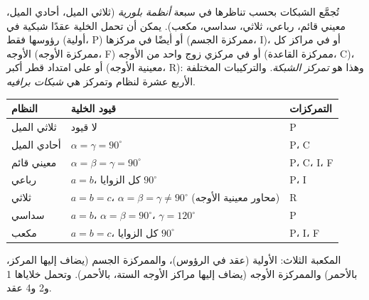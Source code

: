 \begin{definition}\label{def:b3:x-ray-diffraction:crystal-system}
تُجمَّع الشبكات بحسب تناظرها في سبعة \emph{أنظمة
بلورية} (ثلاثي الميل، أحادي الميل، معيني قائم، رباعي،
ثلاثي، سداسي، مكعب). يمكن أن تحمل الخلية عقدًا شبكية في رؤوسها فقط
(أولية، P) أو أيضًا في مركزها (ممركزة الجسم، I)، أو في مراكز كل
الأوجه (ممركزة الأوجه، F) أو في مركزي زوج واحد من الأوجه (ممركزة القاعدة، C)، أو على امتداد
قطر أكبر (معينية الأوجه، R): وهذا هو \emph{تمركز
الشبكة}. والتركيبات المختلفة الأربع عشرة لنظام 
وتمركز هي \emph{شبكات برافيه}.
\end{definition}

\begin{center}\small
\begin{tabular}{lll}
\hline
النظام & قيود الخلية & التمركزات \\ \hline
ثلاثي الميل & لا قيود & P \\
أحادي الميل & $\alpha = \gamma = 90^\circ$ & P، C \\
معيني قائم & $\alpha = \beta = \gamma = 90^\circ$ & P، C، I، F \\
رباعي & $a = b$، كل الزوايا $90^\circ$ & P، I \\
ثلاثي & $a = b = c$، $\alpha = \beta = \gamma \ne 90^\circ$ (محاور معينية الأوجه) & R \\
سداسي & $a = b$، $\alpha = \beta = 90^\circ$، $\gamma = 120^\circ$ & P \\
مكعب & $a = b = c$، كل الزوايا $90^\circ$ & P، I، F \\ \hline
\end{tabular}
\end{center}

\begin{omfigure}

{\small {} المكعبة الثلاث: الأولية (عقد في الرؤوس)،
والممركزة الجسم (يضاف إليها المركز، بالأحمر) والممركزة الأوجه (يضاف إليها مراكز
الأوجه الستة، بالأحمر). وتحمل خلاياها 1 و2 و4 عقد.}
\end{omfigure}

